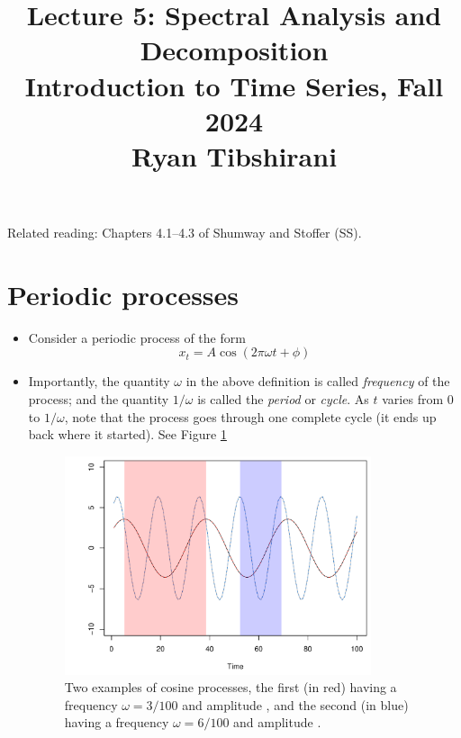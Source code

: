\documentclass{article}
\title{Lecture 5: Spectral Analysis and Decomposition \\ \smallskip  
\large Introduction to Time Series, Fall 2024 \\ \smallskip
Ryan Tibshirani}
\date{}
\begin{document}
\maketitle
\RaggedRight
\vspace{-50pt}

Related reading: Chapters 4.1--4.3 of Shumway and Stoffer (SS).

\section{Periodic processes}

\begin{itemize}
\item Consider a periodic process of the form 
\begin{equation}
\label{eq:cos_process}
x_t = A \cos(2\pi\omega t + \phi)
\end{equation}

\item Importantly, the quantity $\omega$ in the above definition is called 
  \emph{frequency} of the process; and the quantity $1/\omega$ is called the    
  \emph{period} or \emph{cycle}. As $t$ varies from $0$ to $1/\omega$, note that
  the process goes through one complete cycle (it ends up back where it
  started). See Figure \ref{fig:cos_process} 

\begin{figure}[htb]
\centering
\includegraphics[width=0.85\textwidth]{fig/cos-process-1.pdf}
\caption{Two examples of cosine processes, the first (in red) having a frequency  
  $\omega = 3/100$ and amplitude , and the
  second (in blue) having a frequency $\omega = 6/100$ and amplitude
  .} 
\label{fig:cos_process}
\end{figure}


\end{itemize}
\end{document}
